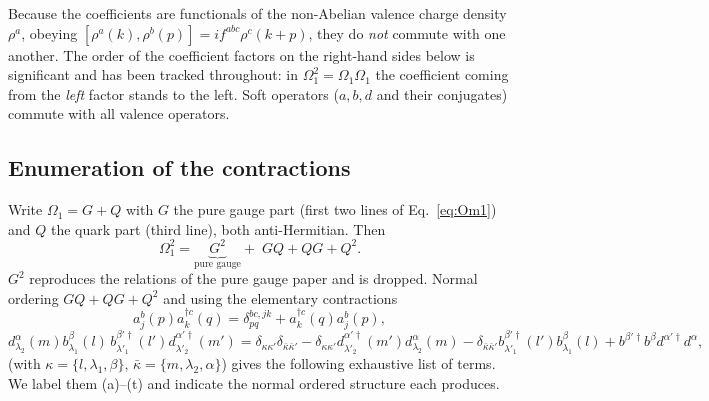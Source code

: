 \documentclass[11pt]{article}
\newcommand{\dg}{\dagger}
\newcommand{\OM}{\Omega}
\begin{document}
Because the coefficients are functionals of the non-Abelian valence charge density
$\rho^{a}$, obeying $[\rho^{a}(k),\rho^{b}(p)]=if^{abc}\rho^{c}(k+p)$, they do \emph{not} commute
with one another. The order of the coefficient factors on the right-hand sides below is
significant and has been tracked throughout: in $\OM_1^2=\OM_1\OM_1$ the coefficient coming from
the \emph{left} factor stands to the left. Soft operators ($a,b,d$ and their conjugates) commute
with all valence operators.

\subsection{Enumeration of the contractions}
\label{sec:enum}

Write $\OM_{1}=G+Q$ with $G$ the pure gauge part (first two lines of Eq.~\eqref{eq:Om1}) and $Q$
the quark part (third line), both anti-Hermitian. Then
\begin{equation}
\OM_{1}^{2}=\underbrace{G^{2}}_{\text{pure gauge}}+\;GQ+QG+Q^{2}.
\end{equation}
$G^{2}$ reproduces the relations of the pure gauge paper and is dropped. Normal ordering
$GQ+QG+Q^{2}$ and using the elementary contractions
\begin{equation}
a^{b}_{j}(p)a^{\dg c}_{k}(q)=\delta^{bc,jk}_{pq}+a^{\dg c}_{k}(q)a^{b}_{j}(p),
\end{equation}
\begin{equation}
d^{\alpha}_{\lambda_{2}}(m)b^{\beta}_{\lambda_{1}}(l)\,
b^{\beta'\dg}_{\lambda'_{1}}(l')d^{\alpha'\dg}_{\lambda'_{2}}(m')
=\delta_{\kappa\kappa'}\delta_{\bar\kappa\bar\kappa'}
-\delta_{\kappa\kappa'}d^{\alpha'\dg}_{\lambda'_{2}}(m')d^{\alpha}_{\lambda_{2}}(m)
-\delta_{\bar\kappa\bar\kappa'}b^{\beta'\dg}_{\lambda'_{1}}(l')b^{\beta}_{\lambda_{1}}(l)
+b^{\beta'\dg}b^{\beta}d^{\alpha'\dg}d^{\alpha},
\label{eq:fermicontr}
\end{equation}
(with $\kappa=\{l,\lambda_{1},\beta\}$, $\bar\kappa=\{m,\lambda_{2},\alpha\}$) gives the following
exhaustive list of terms. We label them (a)--(t) and indicate the normal ordered structure each
produces.
\end{document}

